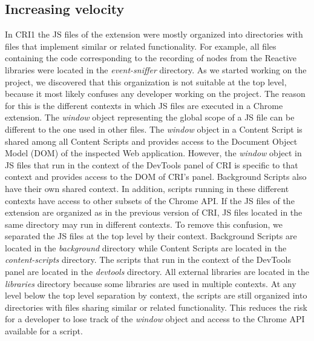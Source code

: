 \subsection{Increasing velocity}
In CRI1 the JS files of the extension were mostly organized into directories with files that implement similar or related functionality. For example, all files containing the code corresponding to the recording of nodes from the Reactive libraries were located in the \emph{event-sniffer} directory. As we started working on the project, we discovered that this organization is not suitable at the top level, because it most likely confuses any developer working on the project. The reason for this is the different contexts in which JS files are executed in a Chrome extension. The \emph{window} object representing the global scope of a JS file can be different to the one used in other files. The \emph{window} object in a Content Script is shared among all Content Scripts and provides access to the Document Object Model (DOM) of the inspected Web application. However, the \emph{window} object in JS files that run in the context of the DevTools panel of CRI is specific to that context and provides access to the DOM of CRI's panel. Background Scripts also have their own shared context. In addition, scripts running in these different contexts have access to other subsets of the Chrome API. If the JS files of the extension are organized as in the previous version of CRI, JS files located in the same directory may run in different contexts. To remove this confusion, we separated the JS files at the top level by their context. Background Scripts are located in the \emph{background} directory while Content Scripts are located in the \emph{content-scripts} directory. The scripts that run in the context of the DevTools panel are located in the \emph{devtools} directory. All external libraries are located in the \emph{libraries} directory because some libraries are used in multiple contexts. At any level below the top level separation by context, the scripts are still organized into directories with files sharing similar or related functionality. This reduces the risk for a developer to lose track of the \emph{window} object and access to the Chrome API available for a script.
